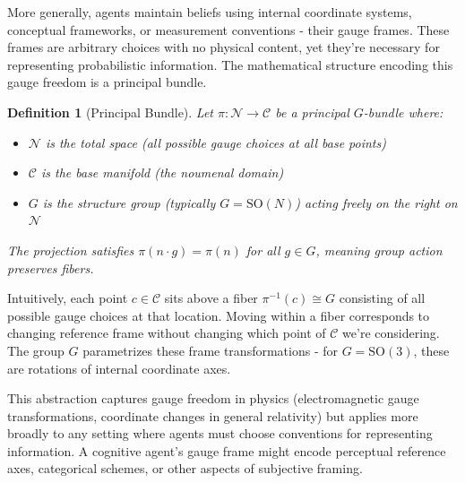 \documentclass[11pt]{article}
\newtheorem{definition}{Definition}
\begin{document}
More generally, agents maintain beliefs using internal coordinate systems, conceptual frameworks, or measurement conventions - their gauge frames. These frames are arbitrary choices with no physical content, yet they're necessary for representing probabilistic information. The mathematical structure encoding this gauge freedom is a principal bundle.

\begin{definition}[Principal Bundle]
Let $\pi: \mathcal{N} \to \mathcal{C}$ be a principal $G$-bundle where:
\begin{itemize}
\item $\mathcal{N}$ is the total space (all possible gauge choices at all base points)
\item $\mathcal{C}$ is the base manifold (the noumenal domain)
\item $G$ is the structure group (typically $G = \mathrm{SO}(N)$) acting freely on the right on $\mathcal{N}$
\end{itemize}
The projection satisfies $\pi(n \cdot g) = \pi(n)$ for all $g \in G$, meaning group action preserves fibers.
\end{definition}

Intuitively, each point $c \in \mathcal{C}$ sits above a fiber $\pi^{-1}(c) \cong G$ consisting of all possible gauge choices at that location. Moving within a fiber corresponds to changing reference frame without changing which point of $\mathcal{C}$ we're considering. The group $G$ parametrizes these frame transformations - for $G = \mathrm{SO}(3)$, these are rotations of internal coordinate axes.

This abstraction captures gauge freedom in physics (electromagnetic gauge transformations, coordinate changes in general relativity) but applies more broadly to any setting where agents must choose conventions for representing information. A cognitive agent's gauge frame might encode perceptual reference axes, categorical schemes, or other aspects of subjective framing.
\end{document}
